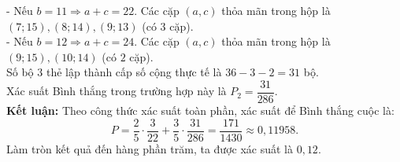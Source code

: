 \begin{ex}
{		- Nếu $b=11 \Rightarrow a+c=22$. Các cặp $(a, c)$ thỏa mãn trong hộp là $(7; 15), (8; 14), (9; 13)$ (có $3$ cặp).\\
		- Nếu $b=12 \Rightarrow a+c=24$. Các cặp $(a, c)$ thỏa mãn trong hộp là $(9; 15), (10; 14)$ (có $2$ cặp).\\
		Số bộ $3$ thẻ lập thành cấp số cộng thực tế là $36 - 3 - 2 = 31$ bộ.\\
		Xác suất Bình thắng trong trường hợp này là $P_2 = \dfrac{31}{286}$.\\
		\textbf{Kết luận:} Theo công thức xác suất toàn phần, xác suất để Bình thắng cuộc là:
		\[ P = \dfrac{2}{5} \cdot \dfrac{3}{22} + \dfrac{3}{5} \cdot \dfrac{31}{286} = \dfrac{171}{1430} \approx 0,11958. \]
		Làm tròn kết quả đến hàng phần trăm, ta được xác suất là $0,12$.
	}
\end{ex}	
